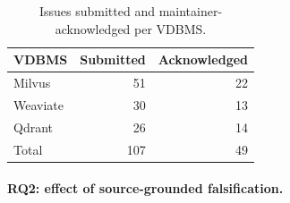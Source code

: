 \documentclass[sigconf]{acmart}
\begin{document}
\begin{table}[t]
\caption{Issues submitted and maintainer-acknowledged per VDBMS.}
\label{tab:yield}
\small
\begin{tabular}{@{}lrr@{}}
\toprule
VDBMS & Submitted & Acknowledged \\
\midrule
Milvus & 51 & 22 \\
Weaviate & 30 & 13 \\
Qdrant & 26 & 14 \\
\midrule
Total & 107 & 49 \\
\bottomrule
\end{tabular}
\end{table}

\paragraph{RQ2: effect of source-grounded falsification.}
\end{document}
